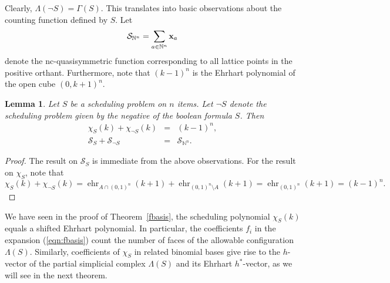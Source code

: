 \documentclass[12pt,reqno]{amsart}
\numberwithin{definition}{section}
\newtheorem{lemma}[definition]{Lemma}
\theoremstyle{definition}
\newcommand{\NN}{\mathbb{N}}
\newcommand{\SSS}{\mathcal{S}}
\newcommand{\ehr}{\operatorname{ehr}}
\newcommand{\allow}{\Lambda} %
\newcommand{\poly}{\chi} %
\newcommand{\forb}{\Gamma} %
\begin{document}
Clearly, $\allow(\neg S)=\forb(S)$. This translates into basic observations about the counting function defined by $S$. Let 
\[
  \SSS_{\NN^n} = \sum_{a\in\NN^n} {\bf x}_a
\]
denote the nc-quasisymmetric function corresponding to all lattice points in the positive orthant. Furthermore, note that $(k-1)^n$ is the Ehrhart polynomial of the open cube $(0,k+1)^n$. 

\begin{lemma}
Let $S$ be a scheduling problem on $n$ items. Let $\neg S$ denote the scheduling problem given by the negative of the boolean formula $S$. Then 
\begin{eqnarray*}
  \poly_{S}(k) + \poly_{\neg S}(k) &=& (k-1)^n, \\
  \SSS_S + \SSS_{\neg S} &=& \SSS_{\NN^n}.
\end{eqnarray*}
\end{lemma}


\begin{proof}
The result on $\SSS_S$ is immediate from the above observations. For the result on $\poly_S$, note that 
\[
 \poly_{S}(k) + \poly_{\neg S}(k) = \ehr_{A\cap(0,1)^n}(k+1) +  \ehr_{(0,1)^n\setminus A}(k+1) = \ehr_{(0,1)^n}(k+1) = (k-1)^n.
\]
\end{proof}

We have seen in the proof of Theorem~\ref{fbasis}, the scheduling polynomial $\chi_S(k)$ equals a shifted Ehrhart polynomial. In particular, the coefficients $f_i$ in the expansion (\ref{eqn:fbasis}) count the number of faces of the allowable configuration $\allow(S)$. Similarly, coefficients of $\chi_S$ in related binomial bases give rise to the $h$-vector of the partial simplicial complex $\allow(S)$ and its Ehrhart $h^*$-vector, as we will see in the next theorem.
\end{document}
